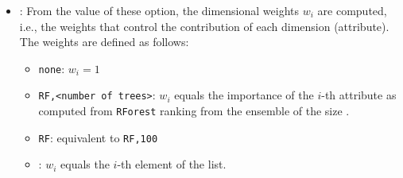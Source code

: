 \begin{itemize}
\begin{itemize}
        \item \optionDescrption{}: From the value of these option, the dimensional weights $w_i$ are computed, i.e., the weights that control the contribution
        of each dimension (attribute). The weights are defined as follows:
        \begin{itemize}
            \item {\tt none}: $w_i = 1$
            \item {\tt RF,<number of trees>}: $w_i$ equals the importance of the $i$-th attribute as computed from {\tt RForest} ranking from the ensemble
            of the size {\tt <number of trees>}.
            \item {\tt RF}: equivalent to {\tt RF,100}
            \item {\tt <explicitly given list of weights>}: $w_i$ equals the $i$-th element of the list.
        \end{itemize}
    \end{itemize}
\end{itemize}